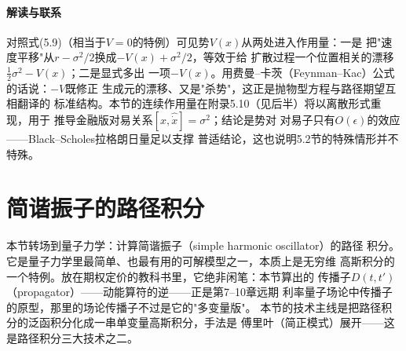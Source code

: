 \paragraph{解读与联系}
对照式(5.9)（相当于$V=0$的特例）可见势$V(x)$从两处进入作用量：一是
把"速度平移"从$r-\sigma^{2}/2$换成$-V(x)+\sigma^{2}/2$，等效于给
扩散过程一个位置相关的漂移$\frac{1}{2}\sigma^{2}-V(x)$；二是显式多出
一项$-V(x)$。用费曼--卡茨（Feynman--Kac）公式的话说：$-V$既修正
生成元的漂移、又是"杀势"，这正是抛物型方程与路径期望互相翻译的
标准结构。本节的连续作用量在附录5.10（见后半）将以离散形式重现，用于
推导金融版对易关系$[\hat{x},\hat{\dot{x}}]=\sigma^{2}$；结论是势对
对易子只有$O(\epsilon)$的效应——Black--Scholes拉格朗日量足以支撑
普适结论，这也说明5.2节的特殊情形并不特殊。

\section{简谐振子的路径积分}

本节转场到量子力学：计算简谐振子（simple harmonic oscillator）的路径
积分。它是量子力学里最简单、也最有用的可解模型之一，本质上是无穷维
高斯积分的一个特例。放在期权定价的教科书里，它绝非闲笔：本节算出的
传播子$D(t,t')$（propagator）——动能算符的逆——正是第7--10章远期
利率量子场论中传播子的原型，那里的场论传播子不过是它的"多变量版"。
本节的技术主线是把路径积分的泛函积分化成一串单变量高斯积分，手法是
傅里叶（简正模式）展开——这是路径积分三大技术之二。


